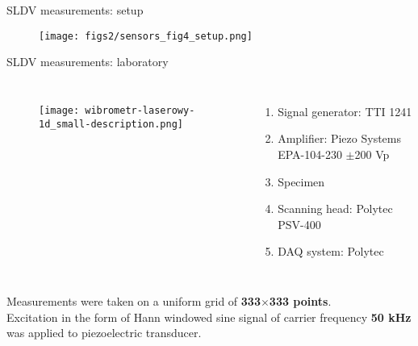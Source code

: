 \documentclass[10pt,aspectratio=169,dvipsnames]{beamer} %
\begin{document}
\begin{frame}[t]{SLDV measurements: setup}
	\begin{figure}
		\texttt{[image: figs2/sensors\_fig4\_setup.png]}
	\end{figure}
\end{frame}
\begin{frame}[t]{SLDV measurements: laboratory}
	\begin{columns}[T]
		\begin{figure}
			\texttt{[image: wibrometr-laserowy-1d\_small-description.png]}
		\end{figure}
		\begin{enumerate}
			\item Signal generator: TTI 1241 
			\item Amplifier: Piezo Systems EPA-104-230 $\pm$200 Vp
			\item Specimen
			\item Scanning head: Polytec PSV-400
			\item DAQ system: Polytec
		\end{enumerate}
	\end{columns}
	{\small
		Measurements were taken on a uniform grid of \textbf{333$\times$333 points}.\\
		Excitation in the form of Hann windowed sine signal of carrier frequency \textbf{50 kHz} was applied to piezoelectric transducer.}
\end{frame}
\end{document}

